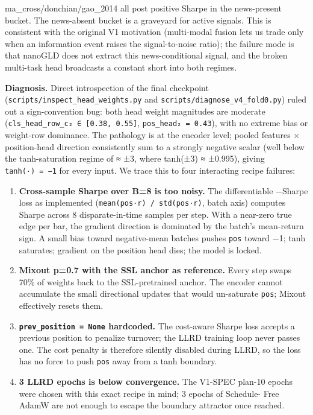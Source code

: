 \documentclass[
]{article}
\providecommand{\tightlist}{%
  \setlength{\itemsep}{0pt}\setlength{\parskip}{0pt}}
\begin{document}
ma\_cross/donchian/gao\_2014 all post positive Sharpe in the
news-present bucket. The news-absent bucket is a graveyard for active
signals. This is consistent with the original V1 motivation (multi-modal
fusion lets us trade only when an information event raises the
signal-to-noise ratio); the failure mode is that nanoGLD does not
extract this news-conditional signal, and the broken multi-task head
broadcasts a constant short into both regimes.

\textbf{Diagnosis.} Direct introspection of the final checkpoint
(\texttt{scripts/inspect\_head\_weights.py} and
\texttt{scripts/diagnose\_v4\_fold0.py}) ruled out a sign-convention
bug: both head weight magnitudes are moderate
(\texttt{\textbar{}\textbar{}cls\_head\_row\_c\textbar{}\textbar{}₂\ ∈\ {[}0.38,\ 0.55{]}},
\texttt{\textbar{}\textbar{}pos\_head\textbar{}\textbar{}₂\ =\ 0.43}),
with no extreme bias or weight-row dominance. The pathology is at the
encoder level; pooled features × position-head direction consistently
sum to a strongly negative scalar (well below the tanh-saturation regime
of ≈ ±3, where tanh(±3) ≈ ±0.995), giving \texttt{tanh(·)\ =\ −1} for
every input. We trace this to four interacting recipe failures:

\begin{enumerate}
\def\labelenumi{\arabic{enumi}.}
\tightlist
\item
  \textbf{Cross-sample Sharpe over B=8 is too noisy.} The differentiable
  −Sharpe loss as implemented (\texttt{mean(pos·r)\ /\ std(pos·r)},
  batch axis) computes Sharpe across 8 disparate-in-time samples per
  step. With a near-zero true edge per bar, the gradient direction is
  dominated by the batch's mean-return sign. A small bias toward
  negative-mean batches pushes \texttt{pos} toward −1; tanh saturates;
  gradient on the position head dies; the model is locked.
\item
  \textbf{Mixout p=0.7 with the SSL anchor as reference.} Every step
  swaps 70\% of weights back to the SSL-pretrained anchor. The encoder
  cannot accumulate the small directional updates that would un-saturate
  \texttt{pos}; Mixout effectively resets them.
\item
  \textbf{\texttt{prev\_position\ =\ None} hardcoded.} The cost-aware
  Sharpe loss accepts a previous position to penalize turnover; the LLRD
  training loop never passes one. The cost penalty is therefore silently
  disabled during LLRD, so the loss has no force to push
  \texttt{\textbar{}pos\textbar{}} away from a tanh boundary.
\item
  \textbf{3 LLRD epochs is below convergence.} The V1-SPEC plan-10
  epochs were chosen with this exact recipe in mind; 3 epochs of
  Schedule- Free AdamW are not enough to escape the boundary attractor
  once reached.
\end{enumerate}
\end{document}
